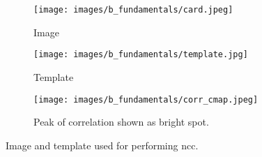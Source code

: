     \begin{figure}[h]
        \begin{subfigure}{0.3\textwidth}
            \centering
            \texttt{[image: images/b\_fundamentals/card.jpeg]}
            \caption{Image}
            \label{subfig:card.jpg}
        \end{subfigure}
        \begin{subfigure}{0.3\textwidth}
            \centering
            \texttt{[image: images/b\_fundamentals/template.jpg]}
            \caption{Template}
            \label{subfig:template.jpg}
        \end{subfigure}
        \begin{subfigure}{0.3\textwidth}
            \centering
            \texttt{[image: images/b\_fundamentals/corr\_cmap.jpeg]}
            \caption{Peak of correlation shown as bright spot.}
            \label{fig:corr_cmap.png}
        \end{subfigure}
        \caption{Image and template used for performing \gls{ncc}. \cite{img_card}}
        \label{fig:ncc_example}
    \end{figure}


    \clearpage